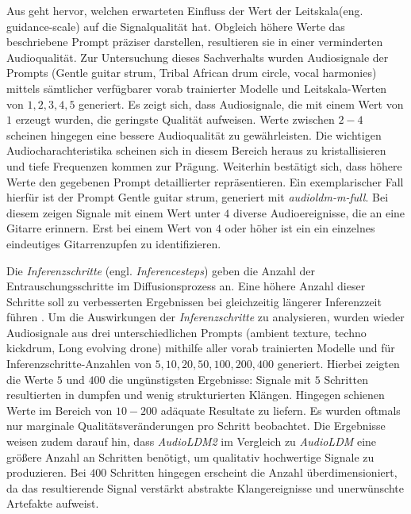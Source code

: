 \documentclass[
  a4paper,  %
  twoside,  %
  bibliography=totoc,
  headsepline,
  cleardoublepage=empty,
  parskip=half,
  draft=false
]{scrbook}
\begin{document}
Aus \cite{noauthor_audioldm_nodate-1, noauthor_audioldm_nodate} geht hervor, welchen erwarteten Einfluss der Wert der \glqq Leitskala\grqq (eng. \glqq guidance-scale\grqq) auf die Signalqualität hat. Obgleich höhere Werte das beschriebene Prompt präziser darstellen, resultieren sie in einer verminderten Audioqualität. Zur Untersuchung dieses Sachverhalts wurden Audiosignale der Prompts (\glqq Gentle guitar strum, Tribal African drum circle, vocal harmonies\grqq) mittels sämtlicher verfügbarer vorab trainierter Modelle und \glqq Leitskala\grqq-Werten von $1,2,3,4,5$ generiert. Es zeigt sich, dass Audiosignale, die mit einem Wert von $1$ erzeugt wurden, die geringste Qualität aufweisen. Werte zwischen $2-4$ scheinen hingegen eine bessere Audioqualität zu gewährleisten. Die wichtigen Audiocharachteristika scheinen sich in diesem Bereich heraus zu kristallisieren und tiefe Frequenzen kommen zur Prägung. Weiterhin bestätigt sich, dass höhere Werte den gegebenen Prompt detaillierter repräsentieren. Ein exemplarischer Fall hierfür ist der Prompt \glqq Gentle guitar strum\grqq, generiert mit \emph{audioldm-m-full}\cite{noauthor_cvsspaudioldm-m-full_nodate}. Bei diesem zeigen Signale mit einem Wert unter $4$ diverse Audioereignisse, die an eine Gitarre erinnern. Erst bei einem Wert von $4$ oder höher ist ein ein einzelnes eindeutiges Gitarrenzupfen zu identifizieren.

Die \emph{Inferenzschritte} (engl. \emph{Inferencesteps}) geben die Anzahl der Entrauschungsschritte im Diffusionsprozess an. Eine höhere Anzahl dieser Schritte soll zu verbesserten Ergebnissen bei gleichzeitig längerer Inferenzzeit führen \cite{noauthor_audioldm_nodate-1, noauthor_audioldm_nodate}. Um die Auswirkungen der \emph{Inferenzschritte} zu analysieren, wurden wieder Audiosignale aus drei unterschiedlichen Prompts (\glqq ambient texture\grqq, \glqq techno kickdrum\grqq, \glqq Long evolving drone\grqq) mithilfe aller vorab trainierten Modelle und für Inferenzschritte-Anzahlen von $5,10,20,50,100,200,400$ generiert. Hierbei zeigten die Werte $5$ und $400$ die ungünstigsten Ergebnisse: Signale mit $5$ Schritten resultierten in dumpfen und wenig strukturierten Klängen. Hingegen schienen Werte im Bereich von $10-200$ adäquate Resultate zu liefern. Es wurden oftmals nur marginale Qualitätsveränderungen pro Schritt beobachtet. Die Ergebnisse weisen zudem darauf hin, dass \emph{AudioLDM2} im Vergleich zu \emph{AudioLDM} eine größere Anzahl an Schritten benötigt, um qualitativ hochwertige Signale zu produzieren. Bei $400$ Schritten hingegen erscheint die Anzahl überdimensioniert, da das resultierende Signal verstärkt abstrakte Klangereignisse und unerwünschte Artefakte aufweist.
\end{document}
